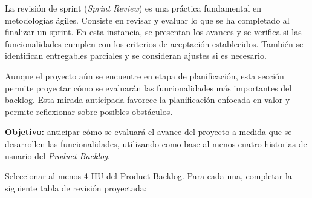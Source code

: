 \documentclass[
11pt, %
]{charter}
\begin{document}
La revisión de sprint (\emph{Sprint Review}) es una práctica fundamental en metodologías ágiles. Consiste en revisar y evaluar lo que se ha completado al finalizar un sprint. En esta instancia, se presentan los avances y se verifica si las funcionalidades cumplen con los criterios de aceptación establecidos. También se identifican entregables parciales y se consideran ajustes si es necesario.

Aunque el proyecto aún se encuentre en etapa de planificación, esta sección permite proyectar cómo se evaluarán las funcionalidades más importantes del backlog. Esta mirada anticipada favorece la planificación enfocada en valor y permite reflexionar sobre posibles obstáculos.

\textbf{Objetivo:} anticipar cómo se evaluará el avance del proyecto a medida que se desarrollen las funcionalidades, utilizando como base al menos cuatro historias de usuario del \emph{Product Backlog}.


Seleccionar al menos 4 HU del Product Backlog. Para cada una, completar la siguiente tabla de revisión proyectada:
\end{document}
